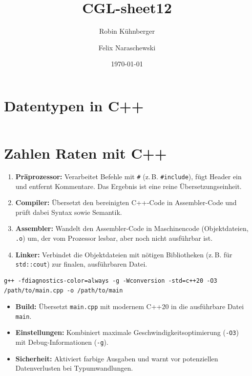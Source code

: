 \documentclass{scrartcl}
\title{CGL-sheet12}
\author[1]{Robin Kühnberger}
\author[2]{Felix Naraschewski}
\affil[1]{University Stuttgart}
\affil[2]{University Stuttgart}
\date{\today}
\begin{document}
\maketitle
\tableofcontents

\section{Datentypen in C++}

\inputminted[breaklines, linenos, bgcolor=gray!10]{cpp}{datentypen.cpp}

\section{Zahlen Raten mit C++}

\begin{enumerate}
  \item \textbf{Präprozessor:} Verarbeitet Befehle mit \texttt{\#} (z.\,B. \texttt{\#include}), fügt Header ein und entfernt Kommentare. Das Ergebnis ist eine reine Übersetzungseinheit.

  \item \textbf{Compiler:} Übersetzt den bereinigten C++-Code in Assembler-Code und prüft dabei Syntax sowie Semantik.

  \item \textbf{Assembler:} Wandelt den Assembler-Code in Maschinencode (Objektdateien, \texttt{.o}) um, der vom Prozessor lesbar, aber noch nicht ausführbar ist.

  \item \textbf{Linker:} Verbindet die Objektdateien mit nötigen Bibliotheken (z.\,B. für \texttt{std::cout}) zur finalen, ausführbaren Datei.
\end{enumerate}

\begin{verbatim}
g++ -fdiagnostics-color=always -g -Wconversion -std=c++20 -O3 /path/to/main.cpp -o /path/to/main
\end{verbatim}

\begin{itemize}
  \item \textbf{Build:} Übersetzt \texttt{main.cpp} mit modernem C++20 in die ausführbare Datei \texttt{main}.
  \item \textbf{Einstellungen:} Kombiniert maximale Geschwindigkeitsoptimierung (\texttt{-O3}) mit Debug-Informationen (\texttt{-g}).
  \item \textbf{Sicherheit:} Aktiviert farbige Ausgaben und warnt vor potenziellen Datenverlusten bei Typumwandlungen.
\end{itemize}
\end{document}
